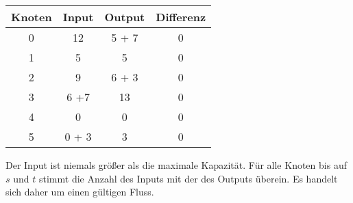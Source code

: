 \documentclass[a4paper,11pt,twoside]{scrartcl}
\begin{document}
\begin{center}
  \begin{tabular}{| c || c | c | c |}
    \hline
    Knoten & Input & Output & Differenz\\ \hline
    0 & 12     & 5 + 7 & 0 \\ \hline
    1 & 5       & 5       & 0 \\ \hline
    2 &  9      & 6 + 3 & 0 \\ \hline
    3 & 6 +7  & 13     & 0 \\ \hline
    4 & 0       & 0       & 0 \\ \hline
    5 & 0 + 3 & 3       & 0 \\ \hline
  \end{tabular}
\end{center}
Der Input ist niemals größer als die maximale Kapazität. Für alle Knoten bis auf $s$ und $t$ stimmt die Anzahl des Inputs mit der des Outputs  überein. Es handelt sich daher um einen gültigen Fluss.
\end{document}

